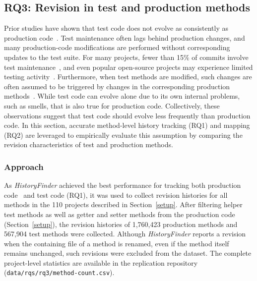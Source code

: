 \subsection{RQ3: Revision in test and production methods}
Prior studies have shown that test code does not evolve as consistently as production code~\cite{zaidman2011studying,levin2017co}. Test maintenance often lags behind production changes, and many production-code modifications are performed without corresponding updates to the test suite. For many projects, fewer than 15\% of commits involve test maintenance~\cite{levin2017co}, and even popular open-source projects may experience limited testing activity~\cite{marsavina2014studying}. Furthermore, when test methods are modified, such changes are often assumed to be triggered by changes in the corresponding production methods~\cite{sun_revisiting_2023,hu2023identify}. While test code can evolve alone due to its own internal problems, such as smells, that is also true for production code. Collectively, these observations suggest that test code should evolve less frequently than production code. In this section, accurate method-level history tracking (RQ1) and mapping (RQ2) are leveraged to empirically evaluate this assumption by comparing the revision characteristics of test and production methods.

\subsubsection{Approach}
As \emph{HistoryFinder} achieved the best performance for tracking both production code~\cite{islam_historyfinder_2025} and test code (RQ1), it was used to collect revision histories for all methods in the 110 projects described in Section~\ref{setup}. After filtering helper test methods as well as getter and setter methods from the production code (Section~\ref{setup}), the revision histories of 1,760,423 production methods and 567,904 test methods were collected. Although \emph{HistoryFinder} reports a revision when the containing file of a method is renamed, even if the method itself remains unchanged, such revisions were excluded from the dataset. The complete project-level statistics are available in the replication repository (\texttt{data/rqs/rq3/method-count.csv}).




